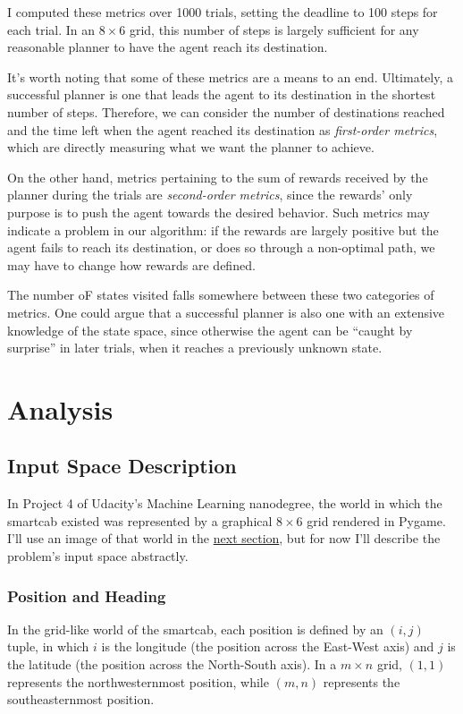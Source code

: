 \documentclass{article}
\begin{document}
I computed these metrics over 1000 trials, setting the deadline to 100 steps for each trial. In an $8\times6$ grid, this number of steps is largely sufficient for any reasonable planner to have the agent reach its destination.

It's worth noting that some of these metrics are a means to an end. Ultimately, a successful planner is one that leads the agent to its destination in the shortest number of steps. Therefore, we can consider the number of destinations reached and the time left when the agent reached its destination as \textit{first-order metrics}, which are directly measuring what we want the planner to achieve.

On the other hand, metrics pertaining to the sum of rewards received by the planner during the trials are \textit{second-order metrics}, since the rewards' only purpose is to push the agent towards the desired behavior. Such metrics may indicate a problem in our algorithm: if the rewards are largely positive but the agent fails to reach its destination, or does so through a non-optimal path, we may have to change how rewards are defined.

The number oF states visited falls somewhere between these two categories of metrics. One could argue that a successful planner is also one with an extensive knowledge of the state space, since otherwise the agent can be ``caught by surprise'' in later trials, when it reaches a previously unknown state. 

\section{Analysis}

\subsection{Input Space Description}

In Project 4 of Udacity's Machine Learning nanodegree, the world in which the smartcab existed was represented by a graphical $8\times6$ grid rendered in Pygame. I'll use an image of that world in the \hyperref[sec:explovis]{next section}, but for now I'll describe the problem's input space abstractly.

\subsubsection{Position and Heading}

In the grid-like world of the smartcab, each position is defined by an $(i, j)$ tuple, in which $i$ is the longitude (the position across the East-West axis) and $j$ is the latitude (the position across the North-South axis). In a $m\times n$ grid, $(1, 1)$ represents the northwesternmost position, while $(m, n)$ represents the southeasternmost position.
\end{document}
